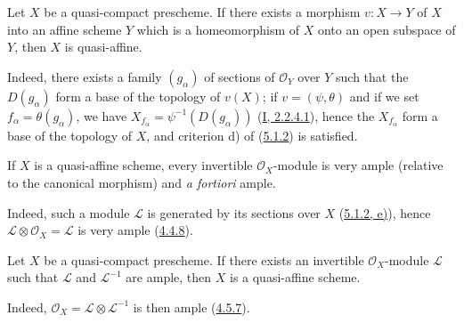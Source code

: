\begin{corollary}[5.1.3]
\label{II.5.1.3}
Let $X$ be a quasi-compact prescheme. If there exists a morphism $v:X\to Y$ of
$X$ into an affine scheme $Y$ which is a homeomorphism of $X$ onto an
open subspace of $Y$, then $X$ is quasi-affine.
\end{corollary}

Indeed, there exists a family $(g_\alpha)$ of sections of $\mathcal{O}_Y$
over $Y$ such that the $D(g_\alpha)$ form a base of the
topology of $v(X)$; if $v=(\psi,\theta)$ and if we set
$f_\alpha=\theta(g_\alpha)$, we have
$X_{f_\alpha}=\psi^{-1}(D(g_\alpha))$
(\hyperref[I.2.2.4.1]{I, 2.2.4.1}), hence the $X_{f_\alpha}$ form a
base of the topology of $X$, and criterion d) of
(\hyperref[II.5.1.2]{5.1.2}) is satisfied.

\begin{corollary}[5.1.4]
\label{II.5.1.4}
If $X$ is a quasi-affine scheme, every invertible $\mathcal{O}_X$-module is
very ample (relative to the canonical morphism) and \emph{a fortiori} ample.
\end{corollary}

Indeed, such a module $\mathcal{L}$ is generated by its sections over
$X$ (\hyperref[II.5.1.2]{5.1.2, e)}), hence
$\mathcal{L}\otimes\mathcal{O}_X=\mathcal{L}$ is very ample
(\hyperref[II.4.4.8]{4.4.8}).

\begin{corollary}[5.1.5]
\label{II.5.1.5}
Let $X$ be a quasi-compact prescheme. If there exists an invertible
$\mathcal{O}_X$-module $\mathcal{L}$ such that $\mathcal{L}$ and
$\mathcal{L}^{-1}$ are ample, then $X$ is a quasi-affine scheme.
\end{corollary}

Indeed, $\mathcal{O}_X=\mathcal{L}\otimes\mathcal{L}^{-1}$ is then ample
(\hyperref[II.4.5.7]{4.5.7}).

